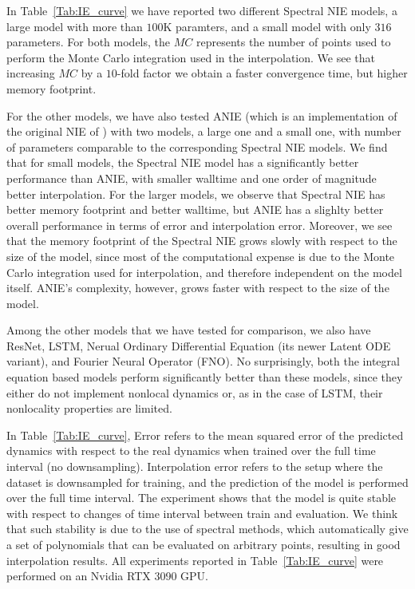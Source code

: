 \documentclass[11pt,fleqn]{amsart} %
\begin{document}
	In Table~\ref{Tab:IE_curve} we have reported two different Spectral NIE models, a large model with more than $100$K paramters, and a small model with only $316$ parameters. For both models, the $MC$ represents the number of points used to perform the Monte Carlo integration used in the interpolation. We see that increasing $MC$ by a $10$-fold factor we obtain a faster convergence time, but higher memory footprint.  
	
	For the other models, we have also tested ANIE (which is an implementation of the original NIE of \cite{ANIE,ANIE_NAT}) with two models, a large one and a small one, with number of parameters comparable to the corresponding Spectral NIE models. We find that for small models, the Spectral NIE model has a significantly better performance than ANIE, with smaller walltime and one order of magnitude better interpolation. For the larger models, we observe that Spectral NIE has better memory footprint and better walltime, but ANIE has a slighlty better overall performance in terms of error and interpolation error. Moreover, we see that the memory footprint of the Spectral NIE grows slowly with respect to the size of the model, since most of the computational expense is due to the Monte Carlo integration used for interpolation, and therefore independent on the model itself. ANIE's complexity, however, grows faster with respect to the size of the model. 
	
	Among the other models that we have tested for comparison, we also have ResNet, LSTM, Nerual Ordinary Differential Equation (its newer Latent ODE variant), and Fourier Neural Operator (FNO). No surprisingly, both the integral equation based models perform significantly better than these models, since they either do not implement nonlocal dynamics or, as in the case of LSTM, their nonlocality properties are limited. 
	
	In Table~\ref{Tab:IE_curve}, Error refers to the mean squared error of the predicted dynamics with respect to the real dynamics when trained over the full time interval (no downsampling). Interpolation error refers to the setup  where the dataset is downsampled for training, and the prediction of the model is performed over the full time interval. The experiment shows that the model is quite stable with respect to changes of time interval between train and evaluation. We think that such stability is due to the use of spectral methods, which automatically give a set of polynomials that can be evaluated on arbitrary points, resulting in good interpolation results. All experiments reported in Table~\ref{Tab:IE_curve} were performed on an Nvidia RTX 3090 GPU. 
	
\end{document}
